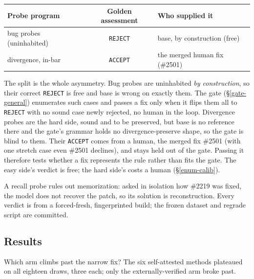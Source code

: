 \documentclass[
  10pt,
]{article}
\newcounter{none} %
\begin{document}
{\def\LTcaptype{none} %
\begin{longtable}[]{@{}lcl@{}}
\toprule\noalign{}
Probe program & Golden assessment & Who supplied it \\
\midrule\noalign{}
\endhead
\bottomrule\noalign{}
\endlastfoot
bug probes (uninhabited) & \texttt{REJECT} & base, by construction
(free) \\
divergence, in-bar & \texttt{ACCEPT} & the merged human fix (\#2501) \\
\end{longtable}
}

The split is the whole asymmetry. Bug probes are uninhabited \emph{by
construction}, so their correct \texttt{REJECT} is free and base is
wrong on exactly them. The gate (\S\ref{gate-general}) enumerates such
cases and passes a fix only when it flips them all to \texttt{REJECT}
with no sound case newly rejected, no human in the loop. Divergence
probes are the hard side, sound and to be preserved, but base is no
reference there and the gate's grammar holds no divergence-preserve
shape, so the gate is blind to them. Their \texttt{ACCEPT} comes from a
human, the merged fix \#2501 (with one stretch case even \#2501
declines), and stays held out of the gate. Passing it therefore tests
whether a fix represents the rule rather than fits the gate. The easy
side's verdict is free; the hard side's costs a human
(\S\ref{enum-calib}).

A recall probe rules out memorization: asked in isolation how \#2219 was
fixed, the model does not recover the patch, so its solution is
reconstruction. Every verdict is from a forced-fresh, fingerprinted
build; the frozen dataset and regrade script are committed.

\subsection{Results}\label{verus}

Which arm climbs past the narrow fix? The six self-attested methods
plateaued on all eighteen draws, three each; only the
externally-verified arm broke past.
\end{document}
